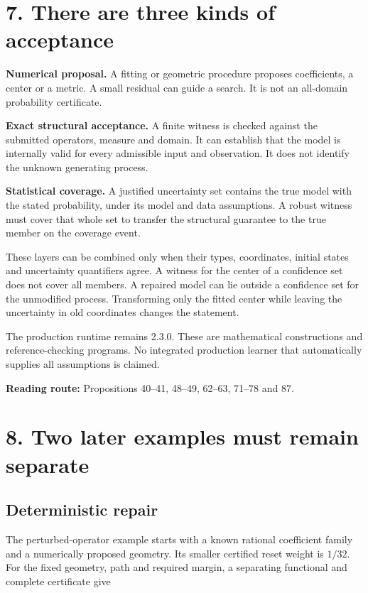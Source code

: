 \documentclass[11pt,letterpaper]{article}
\begin{document}
\section{7. There are three kinds of
acceptance}\label{there-are-three-kinds-of-acceptance}

\textbf{Numerical proposal.} A fitting or geometric procedure proposes
coefficients, a center or a metric. A small residual can guide a search.
It is not an all-domain probability certificate.

\textbf{Exact structural acceptance.} A finite witness is checked
against the submitted operators, measure and domain. It can establish
that the model is internally valid for every admissible input and
observation. It does not identify the unknown generating process.

\textbf{Statistical coverage.} A justified uncertainty set contains the
true model with the stated probability, under its model and data
assumptions. A robust witness must cover that whole set to transfer the
structural guarantee to the true member on the coverage event.

These layers can be combined only when their types, coordinates, initial
states and uncertainty quantifiers agree. A witness for the center of a
confidence set does not cover all members. A repaired model can lie
outside a confidence set for the unmodified process. Transforming only
the fitted center while leaving the uncertainty in old coordinates
changes the statement.

The production runtime remains 2.3.0. These are mathematical
constructions and reference-checking programs. No integrated production
learner that automatically supplies all assumptions is claimed.

\textbf{Reading route:} Propositions 40--41, 48--49, 62--63, 71--78 and
87.

\section{8. Two later examples must remain
separate}\label{two-later-examples-must-remain-separate}

\subsection{Deterministic repair}\label{deterministic-repair}

The perturbed-operator example starts with a known rational coefficient
family and a numerically proposed geometry. Its smaller certified reset
weight is \(1/32\). For the fixed geometry, path and required margin, a
separating functional and complete certificate give
\end{document}
